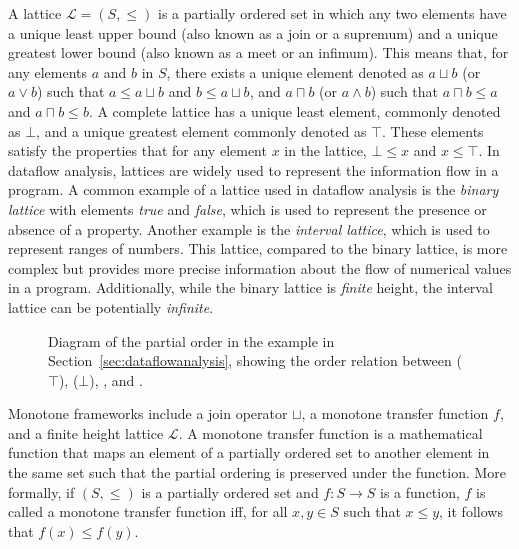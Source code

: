 A lattice $\mathcal{L} = (S, \leq)$ is a partially ordered set in which any two elements have a unique least
upper bound (also known as a join or a supremum) and a unique greatest lower bound
(also known as a meet or an infimum). This means that, for any elements $a$ and $b$ in
$S$, there exists a unique element denoted as  $a \sqcup b$  (or  $a \vee b$)
such that  $a \leq a \sqcup b$  and  $ b \leq a \sqcup b$, and  $a \sqcap b$
(or  $ a\wedge b$) such that  $ a\sqcap b\leq a$  and  $a \sqcap b\leq b$.
A complete lattice has a unique least element, commonly denoted as $\bot$,
and a unique greatest element commonly denoted as $\top$. These elements satisfy
the properties that for any element $x$ in the lattice, $\bot \leq x$ and $x \leq \top$.
In dataflow analysis, lattices are widely used to represent the information flow in a program.
A common example of a lattice used in dataflow analysis is the \emph{binary lattice} with
elements \emph{true} and \emph{false}, which is used to represent the presence or absence of
a property. Another example is the \emph{interval lattice}, which is used
to represent ranges of numbers. This lattice, compared to the binary lattice, is more
complex but provides more precise information about the flow of numerical values
in a program. Additionally, while the binary lattice is \emph{finite} height, the interval lattice can
be potentially \emph{infinite}.
\begin{figure}
     \begin{center}
    \caption{\label{fig:lattice}Diagram of the partial order in the example in
    Section~\ref{sec:dataflowanalysis}, showing the order relation between 
    ($\top$),  ($\bot$), , and .}
  \end{center}
\end{figure}


Monotone frameworks include a join operator $\sqcup$, a monotone transfer function $f$,
and a finite height lattice $\mathcal{L}$.
A monotone transfer function is a mathematical function that maps an element of a
partially ordered set to another element in the same set such that the partial
ordering is preserved under the function. More formally, if $(S, \leq)$ is a
partially ordered set and $f: S \rightarrow S$ is a function, $f$ is called a
monotone transfer function iff, for all $x, y \in S$ such that $x \leq y$, it follows
that $f(x) \leq f(y)$.


